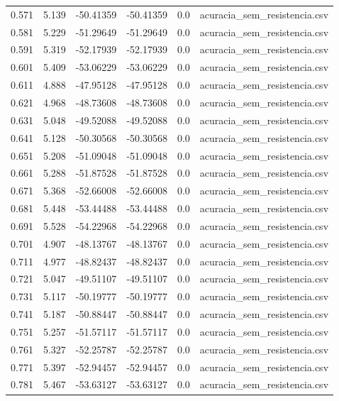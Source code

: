 \begin{table}
\begin{tabular}{llllll}
0.571 & 5.139 & -50.41359 & -50.41359 & 0.0 & acuracia\_sem\_resistencia.csv \\
0.581 & 5.229 & -51.29649 & -51.29649 & 0.0 & acuracia\_sem\_resistencia.csv \\
0.591 & 5.319 & -52.17939 & -52.17939 & 0.0 & acuracia\_sem\_resistencia.csv \\
0.601 & 5.409 & -53.06229 & -53.06229 & 0.0 & acuracia\_sem\_resistencia.csv \\
0.611 & 4.888 & -47.95128 & -47.95128 & 0.0 & acuracia\_sem\_resistencia.csv \\
0.621 & 4.968 & -48.73608 & -48.73608 & 0.0 & acuracia\_sem\_resistencia.csv \\
0.631 & 5.048 & -49.52088 & -49.52088 & 0.0 & acuracia\_sem\_resistencia.csv \\
0.641 & 5.128 & -50.30568 & -50.30568 & 0.0 & acuracia\_sem\_resistencia.csv \\
0.651 & 5.208 & -51.09048 & -51.09048 & 0.0 & acuracia\_sem\_resistencia.csv \\
0.661 & 5.288 & -51.87528 & -51.87528 & 0.0 & acuracia\_sem\_resistencia.csv \\
0.671 & 5.368 & -52.66008 & -52.66008 & 0.0 & acuracia\_sem\_resistencia.csv \\
0.681 & 5.448 & -53.44488 & -53.44488 & 0.0 & acuracia\_sem\_resistencia.csv \\
0.691 & 5.528 & -54.22968 & -54.22968 & 0.0 & acuracia\_sem\_resistencia.csv \\
0.701 & 4.907 & -48.13767 & -48.13767 & 0.0 & acuracia\_sem\_resistencia.csv \\
0.711 & 4.977 & -48.82437 & -48.82437 & 0.0 & acuracia\_sem\_resistencia.csv \\
0.721 & 5.047 & -49.51107 & -49.51107 & 0.0 & acuracia\_sem\_resistencia.csv \\
0.731 & 5.117 & -50.19777 & -50.19777 & 0.0 & acuracia\_sem\_resistencia.csv \\
0.741 & 5.187 & -50.88447 & -50.88447 & 0.0 & acuracia\_sem\_resistencia.csv \\
0.751 & 5.257 & -51.57117 & -51.57117 & 0.0 & acuracia\_sem\_resistencia.csv \\
0.761 & 5.327 & -52.25787 & -52.25787 & 0.0 & acuracia\_sem\_resistencia.csv \\
0.771 & 5.397 & -52.94457 & -52.94457 & 0.0 & acuracia\_sem\_resistencia.csv \\
0.781 & 5.467 & -53.63127 & -53.63127 & 0.0 & acuracia\_sem\_resistencia.csv \\

\end{tabular}
\end{table}
